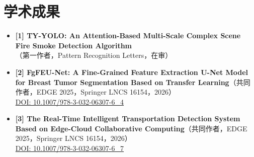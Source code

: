 
\section{学术成果}
\begin{itemize}
\cvpublicationfont
    \item \textbf{[1] TY-YOLO: An Attention-Based Multi-Scale Complex Scene Fire Smoke Detection Algorithm}\\
    （第一作者，Pattern Recognition Letters，在审）
    \item \textbf{[2] FgFEU-Net: A Fine-Grained Feature Extraction U-Net Model for Breast Tumor Segmentation Based on Transfer Learning}（共同作者，EDGE 2025，Springer LNCS 16154，2026）\\
    \href{https://link.springer.com/chapter/10.1007/978-3-032-06307-6_4}{DOI: 10.1007/978-3-032-06307-6\_4}
    \item \textbf{[3] The Real-Time Intelligent Transportation Detection System Based on Edge-Cloud Collaborative Computing}（共同作者，EDGE 2025，Springer LNCS 16154，2026）\\
    \href{https://link.springer.com/chapter/10.1007/978-3-032-06307-6_7}{DOI: 10.1007/978-3-032-06307-6\_7}
\end{itemize}
